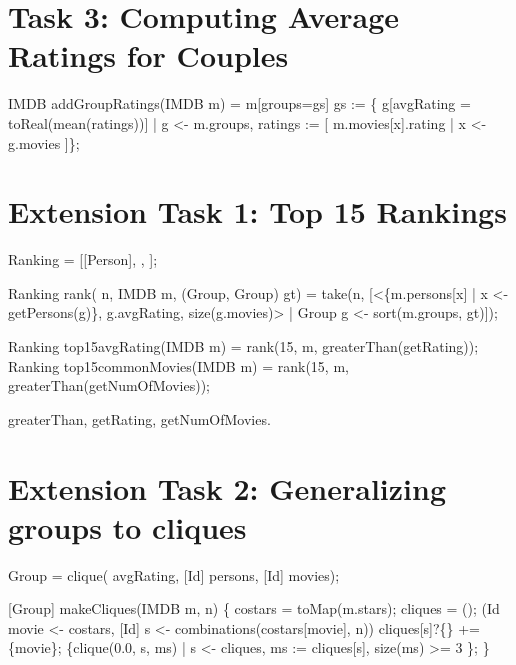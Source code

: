 \documentclass[submission,copyright,creativecommons]{eptcs}
\begin{document}
\section{Task 3: Computing Average Ratings for Couples}

\begin{rascal}
IMDB addGroupRatings(IMDB m) = m{}[groups=gs]
   gs :=
    \{{} g{}[avgRating = toReal(mean(ratings))] 
       | g \textless{}- m.groups, ratings := {}[ m.movies{}[x].rating | x \textless{}- g.movies ]\}{};
\end{rascal}

\section{Extension Task 1: Top 15 Rankings}

\begin{rascal}
 Ranking = [[Person], , ]; 

Ranking rank( n, IMDB m, (Group, Group) gt) =
    take(n, 
       {}[\textless{}\{{}m.persons{}[x] | x \textless{}- getPersons(g)\}{}, g.avgRating, size(g.movies)\textgreater{} 
            | Group g \textless{}- sort(m.groups, gt)]);
\end{rascal}    


\begin{rascal}
Ranking top15avgRating(IMDB m)    = rank(15, m, greaterThan(getRating));    
Ranking top15commonMovies(IMDB m) = rank(15, m, greaterThan(getNumOfMovies));
\end{rascal}

greaterThan, getRating, getNumOfMovies.

\section{Extension Task 2: Generalizing groups to cliques}

\begin{rascal}
 Group = clique( avgRating, [Id] persons, [Id] movies);
\end{rascal}


\begin{rascal}
[Group] makeCliques(IMDB m,  n) \{{}
    costars = toMap(m.stars); cliques = ();
     (Id movie \textless{}- costars, [Id] s \textless{}- combinations(costars{}[movie], n))
      cliques{}[s]?\{\} += \{{}movie\}{};
     \{{}clique(0.0, s, ms) | s \textless{}- cliques, ms := cliques{}[s], size(ms) \textgreater{}= 3 \}{};
\}{}
\end{rascal}
\end{document}
